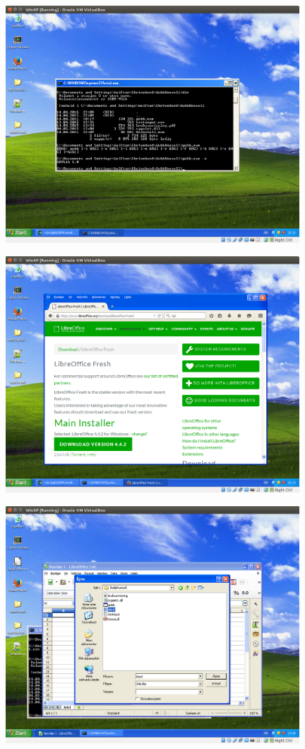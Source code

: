 \documentclass[12pt]{book}
\begin{document}
\includegraphics[width=11cm]{009}

\includegraphics[width=11cm]{010}

\includegraphics[width=11cm]{012}
\end{document}
